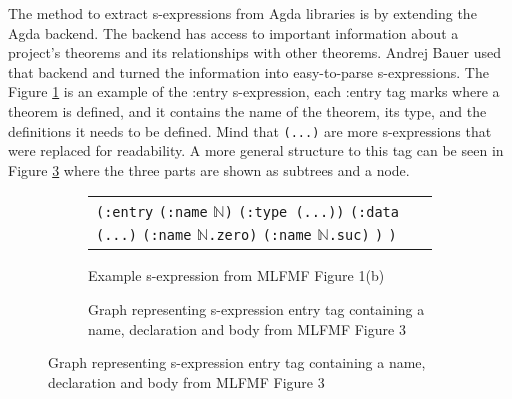 The method to extract s-expressions from Agda libraries is by extending the
Agda backend. The backend has access to important information about a
project's theorems and its relationships with other theorems. Andrej Bauer used
that backend and turned the information into easy-to-parse s-expressions. The
Figure \ref{fig:example-sexp} is an example of the :entry s-expression, each
:entry tag marks where a theorem is defined, and it contains the name of the
theorem, its type, and the definitions it needs to be defined. Mind that
\texttt{(...)} are more s-expressions that were replaced for readability. A
more general structure to this tag can be seen in Figure \ref{fig:sexp-ast}
where the three parts are shown as subtrees and a node.

\begin{figure}[H]
  \begin{subfigure}[b]{0.40\textwidth}
    \centering
    \begin{tabular}{p{5cm}}
      \texttt{(:entry}\newline
      \hphantom{oo}\texttt{(:name} $\mathbb{N}$\texttt{)}\newline
      \hphantom{oo}\texttt{(:type (...))}\newline
      \hphantom{oo}\texttt{(:data}\newline
      \hphantom{oooo}\texttt{(...)}\newline
      \hphantom{oooo}\texttt{(:name} $\mathbb{N}$\texttt{.zero)}\newline
      \hphantom{oooo}\texttt{(:name} $\mathbb{N}$\texttt{.suc)}\newline
      \hphantom{oo}\texttt{)}\newline
      \texttt{)}
    \end{tabular}
    \caption{Example s-expression from MLFMF Figure 1(b) \cite{bauer2023mlfmf}}
    \label{fig:example-sexp}
  \end{subfigure} \hfill
  \begin{subfigure}[b]{0.50\textwidth}
    \centering
    \caption{Graph representing s-expression entry tag containing a name,
    declaration and body from MLFMF Figure 3 \cite{bauer2023mlfmf}}
    \label{fig:sexp-ast}
  \end{subfigure}
\end{figure}

